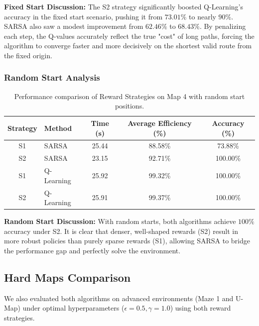 \documentclass{article}
\begin{document}
\textbf{Fixed Start Discussion:} The S2 strategy significantly boosted Q-Learning's accuracy in the fixed start scenario, pushing it from $73.01\%$ to nearly $90\%$. SARSA also saw a modest improvement from $62.46\%$ to $68.43\%$. By penalizing each step, the Q-values accurately reflect the true "cost" of long paths, forcing the algorithm to converge faster and more decisively on the shortest valid route from the fixed origin.

\subsubsection{Random Start Analysis}
\begin{table}[H]
\centering
\begin{tabular}{clccc}
\toprule
\textbf{Strategy} & \textbf{Method} & \textbf{Time (s)} & \textbf{Average Efficiency (\%)} & \textbf{Accuracy (\%)} \\ \midrule
S1 & SARSA       & 25.44 & 88.58\% & 73.88\% \\
S2 & SARSA       & 23.15 & 92.71\% & 100.00\% \\
S1 & Q-Learning  & 25.92 & 99.32\% & 100.00\% \\
S2 & Q-Learning  & 25.91 & 99.37\% & 100.00\% \\ \bottomrule
\end{tabular}
\caption{Performance comparison of Reward Strategies on Map 4 with random start positions.}
\end{table}

\textbf{Random Start Discussion:} With random starts, both algorithms achieve $100\%$ accuracy under S2. It is clear that denser, well-shaped rewards (S2) result in more robust policies than purely sparse rewards (S1), allowing SARSA to bridge the performance gap and perfectly solve the environment.

\subsection{Hard Maps Comparison}
We also evaluated both algorithms on advanced environments (Maze 1 and U-Map) under optimal hyperparameters ($\epsilon=0.5, \gamma=1.0$) using both reward strategies.
\end{document}
